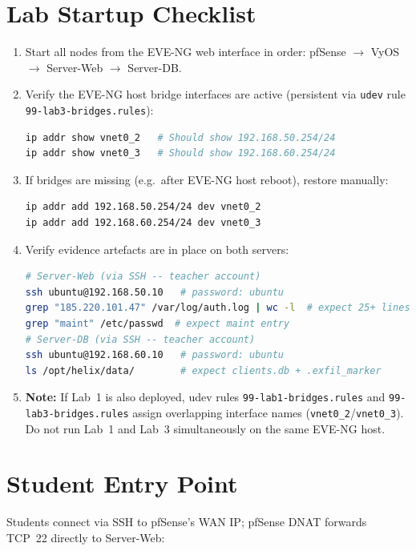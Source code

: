 \section*{Lab Startup Checklist}

\begin{enumerate}
    \item Start all nodes from the EVE-NG web interface in order:
          pfSense $\to$ VyOS $\to$ Server-Web $\to$ Server-DB.
    \item Verify the EVE-NG host bridge interfaces are active (persistent via
          \texttt{udev} rule \texttt{99-lab3-bridges.rules}):
\begin{lstlisting}[language=bash]
ip addr show vnet0_2   # Should show 192.168.50.254/24
ip addr show vnet0_3   # Should show 192.168.60.254/24
\end{lstlisting}
    \item If bridges are missing (e.g.\ after EVE-NG host reboot), restore manually:
\begin{lstlisting}[language=bash]
ip addr add 192.168.50.254/24 dev vnet0_2
ip addr add 192.168.60.254/24 dev vnet0_3
\end{lstlisting}
    \item Verify evidence artefacts are in place on both servers:
\begin{lstlisting}[language=bash]
# Server-Web (via SSH -- teacher account)
ssh ubuntu@192.168.50.10   # password: ubuntu
grep "185.220.101.47" /var/log/auth.log | wc -l  # expect 25+ lines
grep "maint" /etc/passwd  # expect maint entry
# Server-DB (via SSH -- teacher account)
ssh ubuntu@192.168.60.10   # password: ubuntu
ls /opt/helix/data/        # expect clients.db + .exfil_marker
\end{lstlisting}
    \item \textbf{Note:} If Lab~1 is also deployed, udev rules
          \texttt{99-lab1-bridges.rules} and \texttt{99-lab3-bridges.rules}
          assign overlapping interface names (\texttt{vnet0\_2}/\texttt{vnet0\_3}).
          Do not run Lab~1 and Lab~3 simultaneously on the same EVE-NG host.
\end{enumerate}

\section*{Student Entry Point}

Students connect via SSH to pfSense's WAN IP; pfSense DNAT forwards TCP~22 directly to
Server-Web:

